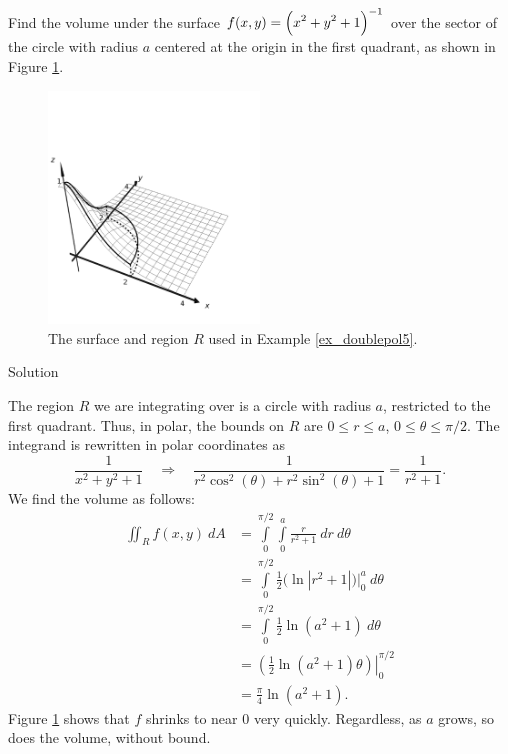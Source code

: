 \ifanalysis
\begin{example}\label{ex_doublepol5}

Find the volume under the surface $\displaystyle f(x,y) =\left(x^2+y^2+1\right)^{-1}$ over the  sector of the circle with radius $a$ centered at the origin in the first quadrant, as shown in Figure \ref{fig_multiple_15}.

\begin{figure}[H]
	\begin{center}
			\includegraphics[width=0.5\textwidth]{fig_multiple_15}
	\caption{The surface and region $R$ used in Example \ref{ex_doublepol5}.}
	\label{fig_multiple_15}
	\end{center}
\end{figure}

Solution 

The region $R$ we are integrating over is a circle with radius $a$, restricted to the first quadrant. Thus, in polar, the bounds on $R$ are $0\leq r\leq a$, $0\leq\theta\leq\pi/2$. The integrand is rewritten in polar coordinates as 
$$\frac{1}{x^2+y^2+1} \quad  \Rightarrow \quad  \frac{1}{r^2\cos^2(\theta)+r^2\sin^2(\theta)+1} = \frac1{r^2+1}.$$
We find the volume as follows:
\begin{align*}
\iint_Rf(x,y)\ dA &= \int\limits_0^{\pi/2}\int\limits_0^a\frac{r}{r^2+1}\ dr\ d\theta\\
		&= \int\limits_0^{\pi/2} \frac12\big(\ln|r^2+1|\big)\Big|_0^a\ d\theta\\
		&=\int\limits_0^{\pi/2} \frac12\ln(a^2+1)\ d\theta\\
		&= \left.\left(\frac12\ln(a^2+1)\theta\right)\right|_0^{\pi/2}\\
		&= \frac{\pi}{4}\ln(a^2+1).
\end{align*}
Figure \ref{fig_multiple_15}  shows that $f$ shrinks to near 0 very quickly. Regardless, as $a$ grows, so does the volume, without bound.
 
\end{example}
\fi

